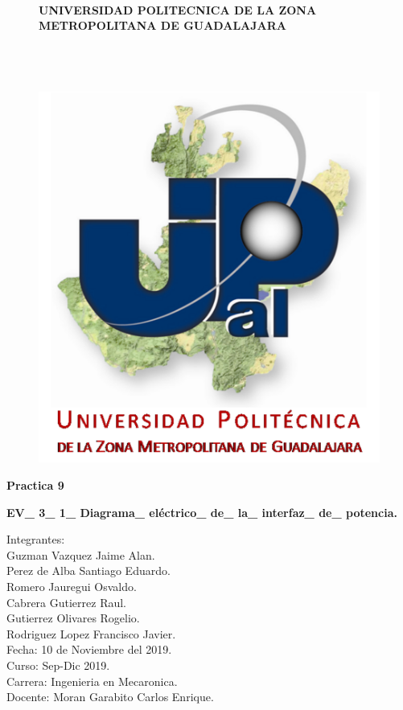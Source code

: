 \documentclass[12pt,letterpaper]{article}
\begin{document}
\begin{figure}[h!]
\centering
\paragraph{UNIVERSIDAD POLITECNICA DE LA ZONA METROPOLITANA DE GUADALAJARA}
\

\
\includegraphics[scale=0.8]{Upzmg.png} 
\end{figure}
\begin{center}
\textbf{\LARGE Practica 9}\\
\end{center}
\begin{center}
\textbf{\LARGE EV\_ 3\_ 1\_ Diagrama\_ eléctrico\_ de\_ la\_ interfaz\_ de\_ potencia.}
\end{center}


\large{Integrantes:}\\
\large{Guzman Vazquez Jaime Alan.\\
Perez de Alba Santiago Eduardo.\\
Romero Jauregui Osvaldo.\\
Cabrera Gutierrez Raul.\\
Gutierrez Olivares Rogelio.\\
Rodriguez Lopez Francisco Javier.\\

Fecha: 10 de Noviembre del 2019.\\

Curso: Sep-Dic 2019.\\

Carrera: Ingenieria en Mecaronica.\\

Docente: Moran Garabito Carlos Enrique.\\}
\end{document}
